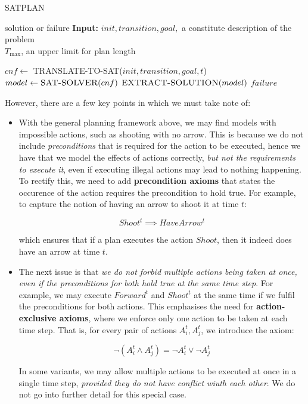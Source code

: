 \documentclass[11pt]{article}
\begin{document}
\begin{algorithm}[!htb]
\caption{\textsc{SATPLAN}}
\begin{algorithmic}[1]
 \Return solution or failure
\State \hspace*{\algorithmicindent} \textbf{Input:} $init, transition, goal,$ a constitute description of the problem\\ 
\hspace*{\algorithmicindent} \hspace*{\algorithmicindent} \hspace*{\algorithmicindent} $T_{\max}$, an upper limit for plan length

\State $cnf \leftarrow$ \textsc{TRANSLATE-TO-SAT}($init, transition, goal, t$)
\State $model \leftarrow \textsc{SAT-SOLVER}(cnf)$
\State \Return $\textsc{EXTRACT-SOLUTION}(model)$
\EndIf
\EndFor
\State \Return $failure$
\EndProcedure
\end{algorithmic}
\end{algorithm}

However, there are a few key points in which we must take note of:

\begin{itemize}
    \item With the general planning framework above, we may find models with impossible actions, such as shooting with no arrow. This is because we do not include \textit{preconditions} that is required for the action to be executed, hence we have that we model the effects of actions correctly, \textit{but not the requirements to execute it}, even if executing illegal actions may lead to nothing happening. To rectify this, we need to add \textbf{precondition axioms} that states the occurence of the action requires the precondition to hold true. For example, to capture the notion of having an arrow to shoot it at time $t$:
    
    $$
    Shoot^t \implies HaveArrow^t
    $$
    
    which ensures that if a plan executes the action $Shoot$, then it indeed does have an arrow at time $t$.
    
    \item The next issue is that \textit{we do not forbid multiple actions being taken at once, even if the preconditions for both hold true at the same time step}. For example, we may execute $Forward^t$ and $Shoot^t$ at the same time if we fulfil the preconditions for both actions. This emphasises the need for \textbf{action-exclusive axioms}, where we enforce only one action to be taken at each time step. That is, for every pair of actions $A^t_i, A^t_j$, we introduce the axiom:
    
    $$
    \lnot (A^t_i \land A^t_j) = \lnot A^t_i \lor \lnot A^t_j
    $$
    
    In some variants, we may allow multiple actions to be executed at once in a single time step, \textit{provided they do not have conflict wiuth each other}. We do not go into further detail for this special case.
\end{itemize}
\end{document}
